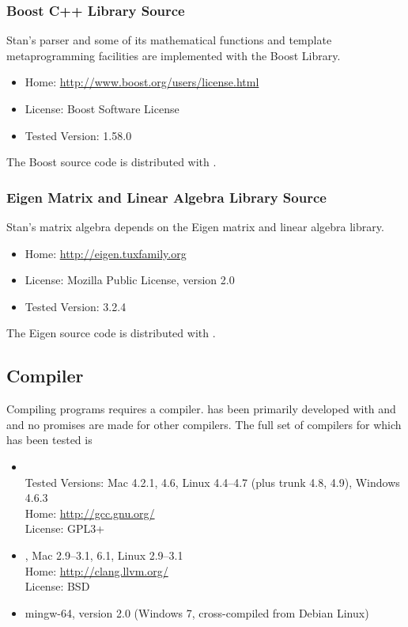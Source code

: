 \subsubsection{Boost C++ Library Source}

Stan's parser and some of its mathematical functions and template
metaprogramming facilities are implemented with the Boost \Cpp
Library.
%
\begin{itemize}
\item Home: \url{http://www.boost.org/users/license.html}
\item License: Boost Software License
\item Tested Version: 1.58.0
\end{itemize}
%
The Boost source code is distributed with \CmdStan.


\subsubsection{Eigen Matrix and Linear Algebra Library Source}

Stan's matrix algebra depends on the Eigen \Cpp matrix and linear
algebra library.  
%
\begin{itemize}
\item Home: \url{http://eigen.tuxfamily.org}
\item License: Mozilla Public License, version 2.0
\item Tested Version: 3.2.4
\end{itemize}
%
The Eigen source code is distributed with \CmdStan.


\subsection{\Cpp Compiler}

Compiling \CmdStan programs requires a \Cpp compiler.  \CmdStan has been
primarily developed with \clang and \gpp and no promises are made for
other compilers.  The full set of compilers for which \CmdStan has been
tested is
%
\begin{itemize}
%
\item \gpp
\\
Tested Versions: Mac 4.2.1, 4.6, Linux 4.4--4.7 (plus trunk 4.8, 4.9), Windows 4.6.3
\\
Home: \url{http://gcc.gnu.org/}
\\
License: GPL3+
%
\item \clang, Mac 2.9--3.1, 6.1, Linux 2.9--3.1
\\
Home: \url{http://clang.llvm.org/}
\\
License: BSD
%
\item mingw-64, version 2.0 (Windows 7, cross-compiled from Debian Linux)
%
\end{itemize}
%


